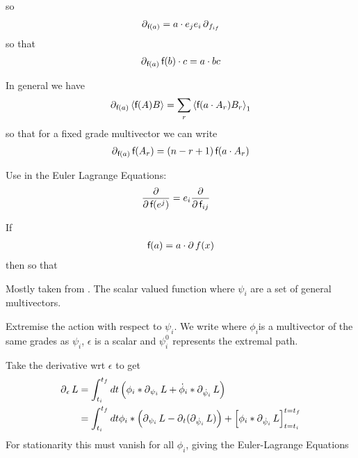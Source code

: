 so
\begin{align}
 \operatorname{\partial}_{{\textsf {f}}(a)} = a\cdot e_j e_i \operatorname{\partial}_{f_{if}}
\end{align}
so that 
\begin{align}
 \operatorname{\partial}_{{\textsf {f}}(a)} {\textsf {f}}(b)\cdot c = a\cdot b c
\end{align}

In general we have
\begin{align}
  \operatorname{\partial} _{{\textsf {f}}(a)} \left< {\textsf {f}}(A)B \right> = \sum_r \left< {\textsf {f}}(a\cdot A_r)B_r \right>_1
\end{align}
so that for a fixed grade multivector we can write
\begin{align}
 \operatorname{\partial}_{{\textsf {f}}(a)} {\textsf {f}}({A_r}) = \left(n-r+1\right){\textsf {f}}(a\cdot A_r)
\end{align}

Use in the Euler Lagrange Equations:
\begin{align}
\frac{\operatorname{\partial}}{\operatorname{\partial}{\textsf {f}}(e^j)} &= e_i \frac{\operatorname{\partial}}{\operatorname{\partial} {\textsf {f}}_{ij}}
\end{align}

If
\begin{align}
{\textsf {f}}(a) = a\cdot \operatorname{\partial} f(x) 
\end{align}
then
so that






Mostly taken from \cite{Lasenby1993}.
The scalar valued function 
where $\psi_i$ are a set of general multivectors.

Extremise the action
with respect to $\psi_i$.
We write 
where $\phi_i$is a multivector of the same grades as $\psi_i$,
$\epsilon$ is a scalar and $\psi_i^0$ represents the extremal path.

Take the derivative wrt $\epsilon$ to get
\begin{align}
  \operatorname{\partial}_\epsilon L &= \int_{t_i}^{t_f} dt \left( 
    \phi_i \ast \operatorname{\partial}_{\psi_i} L + \dot{\phi}_i\ast \operatorname{\partial}_{\dot{\psi}_i} L
    \right)\\
&= \int_{t_i}^{t_f} dt  
    \phi_i \ast \left(\operatorname{\partial}_{\psi_i} L - \operatorname{\partial}_t( \operatorname{\partial}_{\dot{\psi}_i} L) \right)
+
\left[ \phi_i\ast\operatorname{\partial}_{\dot{\psi}_i } L  \right]_{t = t_i}^{t = t_f}
\end{align}
For stationarity this must vanish for all $\phi_i$,
giving the Euler-Lagrange Equations


